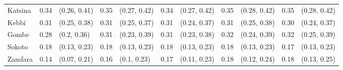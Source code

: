 \begin{tabular}{lrlrlrlrlrl}
Katsina & 0.34 & (0.26, 0.41) & 0.35 & (0.27, 0.42) & 0.34 & (0.27, 0.42) & 0.35 & (0.28, 0.42) & 0.35 & (0.28, 0.42)\\
Kebbi & 0.31 & (0.25, 0.38) & 0.31 & (0.25, 0.37) & 0.31 & (0.24, 0.37) & 0.31 & (0.25, 0.38) & 0.30 & (0.24, 0.37)\\
Gombe & 0.28 & (0.2, 0.36) & 0.31 & (0.23, 0.39) & 0.31 & (0.23, 0.38) & 0.32 & (0.24, 0.39) & 0.32 & (0.25, 0.39)\\
Sokoto & 0.18 & (0.13, 0.23) & 0.18 & (0.13, 0.23) & 0.18 & (0.13, 0.23) & 0.18 & (0.13, 0.23) & 0.17 & (0.13, 0.23)\\
Zamfara & 0.14 & (0.07, 0.21) & 0.16 & (0.1, 0.23) & 0.17 & (0.11, 0.23) & 0.18 & (0.12, 0.24) & 0.18 & (0.13, 0.25)\\
\bottomrule
\end{tabular}
